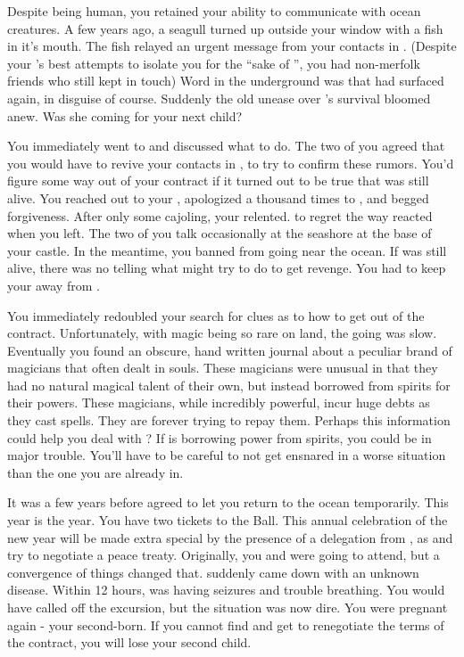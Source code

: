 \documentclass[char]{NeptuneBall}
\begin{document}
Despite being human, you retained your ability to communicate with ocean creatures. A few years ago, a seagull turned up outside your window with a fish in it's mouth. The fish relayed an urgent message from your contacts in \pAtlantis{}. (Despite your \cKing{\parent}'s best attempts to isolate you for the ``sake of \pAtlantis{}'', you had non-merfolk friends who still kept in touch) Word in the underground was that \cWitch{} had surfaced again, in disguise of course.  Suddenly the old unease over \cWitch{}'s survival bloomed anew. Was she coming for your next child? 

You immediately went to \cEric{} and discussed what to do. The two of you agreed that you would have to revive your contacts in \pAtlantis{}, to try to confirm these rumors. You'd figure some way out of your contract if it turned out to be true that \cWitch{} was still alive. You reached out to your \cKing{\parent}, apologized a thousand times to \cKing{\them}, and begged \cKing{\their} forgiveness. After only some cajoling, your \cKing{\parent} relented. \cKing{\They} \cKing{\seem} to regret the way \cKing{\they} reacted when you left. The two of you talk occasionally at the seashore at the base of your castle.  In the meantime, you banned \cWillow{} from going near the ocean. If \cWitch{} was still alive, there was no telling what \cWitch{\they} might try to do to get revenge. You had to keep your \cWillow{\offspring} away from \cWitch{}.

You immediately redoubled your search for clues as to how to get out of the contract. Unfortunately, with magic being so rare on land, the going was slow. Eventually you found an obscure, hand written journal about a peculiar brand of magicians that often dealt in souls. These magicians were unusual in that they had no natural magical talent of their own, but instead borrowed from spirits for their powers. These magicians, while incredibly powerful, incur huge debts as they cast spells. They are forever trying to repay them. Perhaps this information could help you deal with \cWitch{}? If \cWitch{} is borrowing power from spirits, you could be in major trouble. You'll have to be careful to not get ensnared in a worse situation than the one you are already in.

It was a few years before \cKing{\King} \cKing{} agreed to let you return to the ocean temporarily. This year is the year. You have two tickets to the \cExExKing{} Ball. This annual celebration of the new year will be made extra special by the presence of a delegation from \pPacifica{}, as \pAtlantis{} and \pPacifica{} try to negotiate a peace treaty. Originally, you and \cEric{} were going to attend, but a convergence of things changed that. \cEric{} suddenly came down with an unknown disease. Within 12 hours, \cEric{} was having seizures and trouble breathing. You would have called off the excursion, but the situation was now dire. You were pregnant again - your second-born. If you cannot find \cWitch{} and get \cWitch{\them} to renegotiate the terms of the contract, you will lose your second child.
\end{document}
